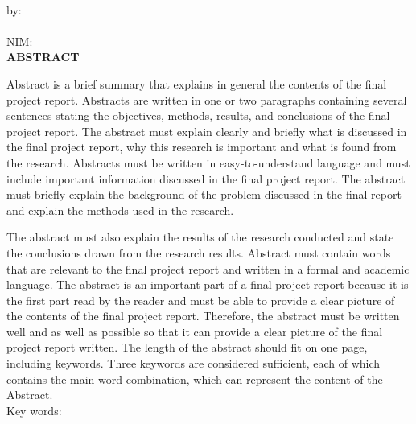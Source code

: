 \clearpage
{}
{}
\begin{center}
    \textbf{\large{\judulen}}\\[0.5cm]
    by:\\
    \penulis\\
    NIM: \nim\\[2em]
    \textbf{ABSTRACT}\\[0.5cm]
\end{center}

Abstract is a brief summary that explains in general the contents of the final project report. Abstracts are written in one or two paragraphs containing several sentences stating the objectives, methods, results, and conclusions of the final project report. The abstract must explain clearly and briefly what is discussed in the final project report, why this research is important and what is found from the research. Abstracts must be written in easy-to-understand language and must include important information discussed in the final project report. The abstract must briefly explain the background of the problem discussed in the final report and explain the methods used in the research.

The abstract must also explain the results of the research conducted and state the conclusions drawn from the research results. Abstract must contain words that are relevant to the final project report and written in a formal and academic language. The abstract is an important part of a final project report because it is the first part read by the reader and must be able to provide a clear picture of the contents of the final project report. Therefore, the abstract must be written well and as well as possible so that it can provide a clear picture of the final project report written. The length of the abstract should fit on one page, including keywords. Three keywords are considered sufficient, each of which contains the main word combination, which can represent the content of the Abstract.\\[0.75cm]

\noindent Key words: \keywords
